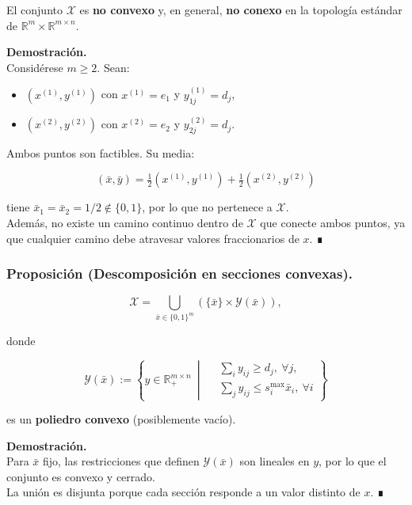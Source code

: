 \documentclass[
  spanish,
  us-letterpaper,
  DIV=11,
  numbers=noendperiod]{scrreprt}
\providecommand{\tightlist}{%
  \setlength{\itemsep}{0pt}\setlength{\parskip}{0pt}}
\numberwithin{equation}{section}
\begin{document}
El conjunto \(\mathcal{X}\) es \textbf{no convexo} y, en general,
\textbf{no conexo} en la topología estándar de
\(\mathbb{R}^m \times \mathbb{R}^{m\times n}\).

\textbf{Demostración.}\\
Considérese \(m \ge 2\). Sean:

\begin{itemize}
\tightlist
\item
  \((x^{(1)}, y^{(1)})\) con \(x^{(1)} = e_1\) y \(y^{(1)}_{1j} = d_j\),
\item
  \((x^{(2)}, y^{(2)})\) con \(x^{(2)} = e_2\) y \(y^{(2)}_{2j} = d_j\).
\end{itemize}

Ambos puntos son factibles. Su media:

\[
(\bar{x}, \bar{y}) = \tfrac{1}{2}(x^{(1)}, y^{(1)}) + \tfrac{1}{2}(x^{(2)}, y^{(2)})
\]

tiene \(\bar{x}_1 = \bar{x}_2 = 1/2 \notin \{0,1\}\), por lo que no
pertenece a \(\mathcal{X}\).\\
Además, no existe un camino continuo dentro de \(\mathcal{X}\) que
conecte ambos puntos, ya que cualquier camino debe atravesar valores
fraccionarios de \(x\). ∎

\subsubsection{\texorpdfstring{\textbf{Proposición (Descomposición en
secciones
convexas).}}{Proposición (Descomposición en secciones convexas).}}\label{proposiciuxf3n-descomposiciuxf3n-en-secciones-convexas.}

\[
\mathcal{X}
=
\bigcup_{\bar{x} \in \{0,1\}^m}
\left(
\{\bar{x}\} \times \mathcal{Y}(\bar{x})
\right),
\]

donde

\[
\mathcal{Y}(\bar{x}) :=
\left\{
y \in \mathbb{R}_+^{m \times n}
\ \middle|\
\begin{aligned}
&\sum_i y_{ij} \ge d_j,\ \forall j, \\
&\sum_j y_{ij} \le s_i^{\max} \bar{x}_i,\ \forall i
\end{aligned}
\right\}
\]

es un \textbf{poliedro convexo} (posiblemente vacío).

\textbf{Demostración.}\\
Para \(\bar{x}\) fijo, las restricciones que definen
\(\mathcal{Y}(\bar{x})\) son lineales en \(y\), por lo que el conjunto
es convexo y cerrado.\\
La unión es disjunta porque cada sección responde a un valor distinto de
\(x\). ∎
\end{document}
